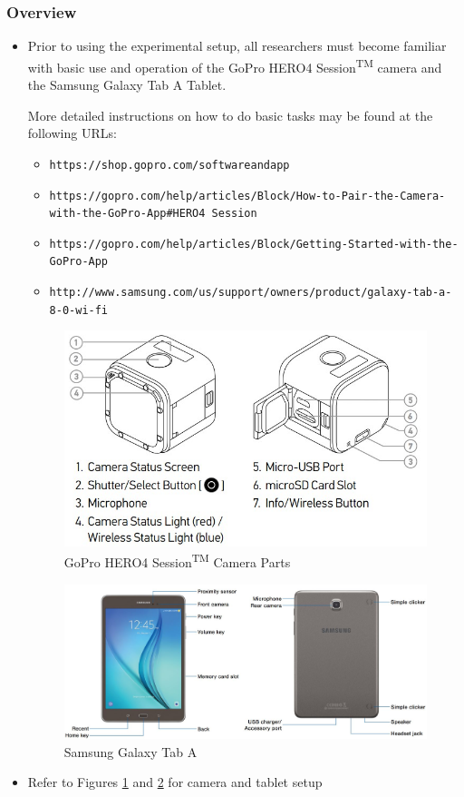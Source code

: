 \documentclass[letterpaper,11pt]{article}
\begin{document}
    \subsubsection{Overview}
        \begin{itemize}
        \item Prior to using the experimental setup, all researchers must become 
        familiar with basic use and operation of the 
        GoPro\textsuperscript{\textcopyright} HERO4
        Session\textsuperscript{TM} camera and the Samsung Galaxy Tab A Tablet. 
        
        More detailed instructions on how to do basic tasks may be found at the 
        following URLs:
        \begin{itemize}
        \item \texttt{https://shop.gopro.com/softwareandapp}
        \item \texttt{https://gopro.com/help/articles/Block/How-to-Pair-the-Camera-with-the-GoPro-App\#HERO4 Session}
        \item \texttt{https://gopro.com/help/articles/Block/Getting-Started-with-the-GoPro-App}
        \item \texttt{http://www.samsung.com/us/support/owners/product/galaxy-tab-a-8-0-wi-fi}
        \end{itemize}
    
    
\begin{figure}[H]
\centering
\includegraphics[width=.6\textwidth]{Camera_diagram.jpg}
\caption{GoPro\textsuperscript{\textcopyright} HERO4
        Session\textsuperscript{TM} Camera Parts}
\label{fig:cam_diag}
\end{figure}

\begin{figure}[H]
\centering
\includegraphics[width=1\textwidth]{tablet.jpg}
\caption{Samsung Galaxy Tab A}
\label{fig:tablet}
\end{figure}
    
    \item Refer to Figures \ref{fig:cam_diag} and \ref{fig:tablet} for camera 
        and tablet setup
        
     \end{itemize}
        
\end{document}

